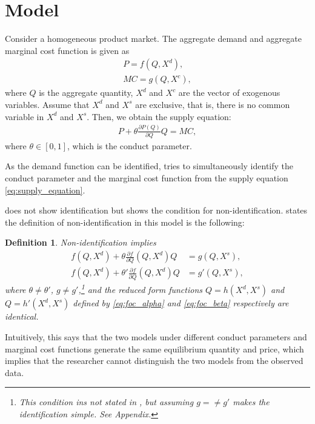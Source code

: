 \documentclass[11pt, a4paper]{article}
\newtheorem{definition}{Definition}
\theoremstyle{remark}
\begin{document}
\section{Model}
Consider a homogeneous product market.
The aggregate demand and aggregate marginal cost function is given as
\begin{align}
    P = f(Q, X^{d}), \label{eq:demand}
    \\
    MC = g(Q, X^{c}),\label{eq:marginal_cost}
\end{align}
where $Q$ is the aggregate quantity, $X^{d}$ and $X^{c}$ are the vector of exogenous variables.
Assume that $X^{d}$ and $X^{s}$ are exclusive, that is, there is no common variable in $X^{d}$ and $X^{s}$.
Then, we obtain the supply equation:
\begin{align}
     P + \theta\frac{\partial P(Q)}{\partial Q}Q = MC,\label{eq:supply_equation}
\end{align}
where $\theta\in[0,1]$, which is the conduct parameter.

As the demand function can be identified, \citet{lau1982identifying} tries to simultaneously identify the conduct parameter and the marginal cost function from the supply equation \eqref{eq:supply_equation}.

\citet{lau1982identifying} does not show identification but shows the condition for non-identification.
\citet{lau1982identifying} states the definition of non-identification in this model is the following:
\begin{definition}\label{def:non_identification}
    Non-identification implies
    \begin{align}
    f(Q, X^{d}) + \theta \frac{\partial f}{\partial Q}(Q, X^{d})Q &= g(Q, X^{s}),\label{eq:foc_alpha}\\
    f(Q, X^{d}) + \theta' \frac{\partial f}{\partial Q}(Q, X^{d})Q &= g'(Q, X^{s}), \label{eq:foc_beta}
    \end{align}
    where $\theta \neq \theta'$, $g \ne g'$,\footnote{This condition ins not stated in \citet{lau1982identifying}, but assuming $g =\ne g'$ makes the identification simple. See Appendix.} and the reduced form functions $Q = h(X^{d}, X^{s})$ and $Q = h'(X^{d}, X^{s})$ defined by \eqref{eq:foc_alpha} and \eqref{eq:foc_beta} respectively are identical.
\end{definition}
Intuitively, this says that the two models under different conduct parameters and marginal cost functions generate the same equilibrium quantity and price, which implies that the researcher cannot distinguish the two models from the observed data.
\end{document}
